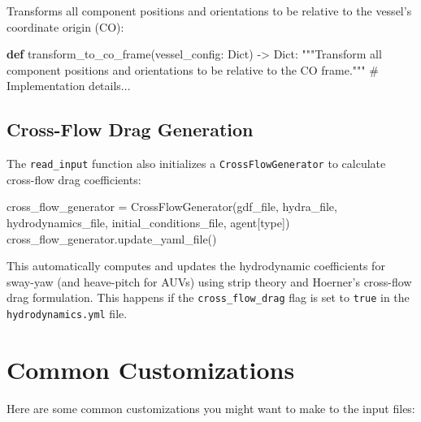 \documentclass[
  letterpaper,
  DIV=11,
  numbers=noendperiod]{scrreprt}
\newenvironment{Shaded}{\begin{snugshade}}{\end{snugshade}}
\newcommand{\CommentTok}[1]{\textcolor[rgb]{0.37,0.37,0.37}{#1}}
\newcommand{\KeywordTok}[1]{\textcolor[rgb]{0.00,0.23,0.31}{\textbf{#1}}}
\newcommand{\NormalTok}[1]{\textcolor[rgb]{0.00,0.23,0.31}{#1}}
\newcommand{\OperatorTok}[1]{\textcolor[rgb]{0.37,0.37,0.37}{#1}}
\newcommand{\StringTok}[1]{\textcolor[rgb]{0.13,0.47,0.30}{#1}}
\begin{document}
Transforms all component positions and orientations to be relative to
the vessel's coordinate origin (CO):

\begin{Shaded}
\begin{Highlighting}[]
\KeywordTok{def}\NormalTok{ transform\_to\_co\_frame(vessel\_config: Dict) }\OperatorTok{{-}\textgreater{}}\NormalTok{ Dict:}
    \CommentTok{"""Transform all component positions and orientations to be relative to the CO frame."""}
    \CommentTok{\# Implementation details...}
\end{Highlighting}
\end{Shaded}

\subsection*{Cross-Flow Drag
Generation}\label{cross-flow-drag-generation}

The \texttt{read\_input} function also initializes a
\texttt{CrossFlowGenerator} to calculate cross-flow drag coefficients:

\begin{Shaded}
\begin{Highlighting}[]
\NormalTok{cross\_flow\_generator }\OperatorTok{=}\NormalTok{ CrossFlowGenerator(gdf\_file, hydra\_file, hydrodynamics\_file, }
\NormalTok{                                         initial\_conditions\_file, agent[}\StringTok{\textquotesingle{}type\textquotesingle{}}\NormalTok{])}
\NormalTok{cross\_flow\_generator.update\_yaml\_file()}
\end{Highlighting}
\end{Shaded}

This automatically computes and updates the hydrodynamic coefficients
for sway-yaw (and heave-pitch for AUVs) using strip theory and Hoerner's
cross-flow drag formulation. This happens if the
\texttt{cross\_flow\_drag} flag is set to \texttt{true} in the
\texttt{hydrodynamics.yml} file.

\section*{Common Customizations}\label{common-customizations}


Here are some common customizations you might want to make to the input
files:
\end{document}
